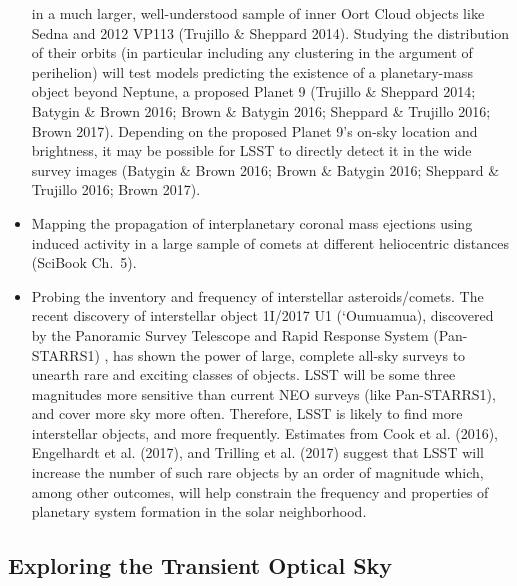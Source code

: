 \begin{itemize}
in a much larger, well-understood sample of inner Oort Cloud objects like Sedna and 2012 VP113
 (Trujillo \& Sheppard 2014).  Studying the distribution of their orbits (in particular including any
clustering in the argument of perihelion) will test models predicting the existence of a planetary-mass object beyond Neptune, a proposed Planet 9 (Trujillo \& Sheppard 2014;  Batygin  \& Brown 2016; Brown \& Batygin 2016; Sheppard  \& Trujillo 2016; Brown 2017). Depending on the proposed Planet 9's on-sky location and brightness, it may be possible for LSST to directly detect it in the wide survey images (Batygin  \& Brown 2016; Brown \& Batygin 2016; Sheppard  \& Trujillo 2016; Brown 2017).

\item Mapping the propagation of interplanetary coronal mass ejections using induced
 activity in a large sample of comets at different heliocentric distances
(SciBook Ch.~5).
\item Probing the inventory and frequency of  interstellar asteroids/comets. The recent discovery of interstellar object
1I/2017 U1 (`Oumuamua), discovered by the Panoramic Survey Telescope and Rapid Response System (Pan-STARRS1) \citep{MPEC1}, has shown the power  of large, complete all-sky surveys to unearth
rare and exciting classes of objects. LSST will be some three magnitudes more sensitive
than  current NEO surveys (like Pan-STARRS1), and cover more sky more
often. Therefore, LSST is likely to find more interstellar objects, and more frequently.
Estimates from  Cook et al. (2016),  Engelhardt et al. (2017), and Trilling et al. (2017) suggest that LSST will increase the number of  such rare objects by an order of magnitude which, among other outcomes, will help
constrain the frequency and properties of planetary system formation in the solar neighborhood.
\end{itemize}


\subsection{ Exploring the Transient Optical Sky }




